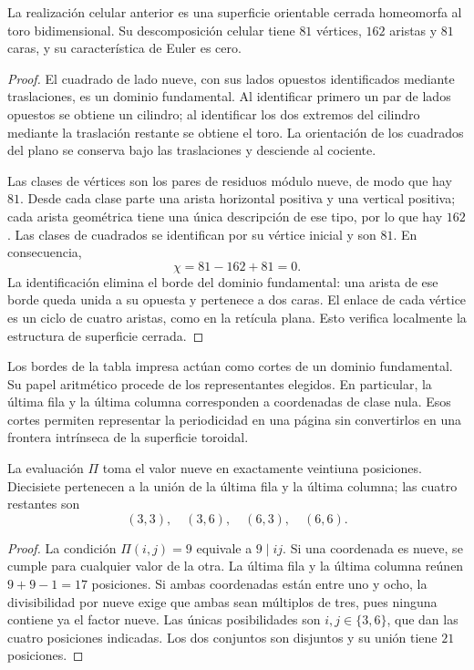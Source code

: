 \begin{proposicion}
\label{geo:prop-toro}
La realización celular anterior es una superficie orientable cerrada homeomorfa al toro bidimensional. Su descomposición celular tiene $81$ vértices, $162$ aristas y $81$ caras, y su característica de Euler es cero.
\end{proposicion}

\begin{proof}
El cuadrado de lado nueve, con sus lados opuestos identificados mediante traslaciones, es un dominio fundamental. Al identificar primero un par de lados opuestos se obtiene un cilindro; al identificar los dos extremos del cilindro mediante la traslación restante se obtiene el toro. La orientación de los cuadrados del plano se conserva bajo las traslaciones y desciende al cociente.

Las clases de vértices son los pares de residuos módulo nueve, de modo que hay $81$. Desde cada clase parte una arista horizontal positiva y una vertical positiva; cada arista geométrica tiene una única descripción de ese tipo, por lo que hay $162$. Las clases de cuadrados se identifican por su vértice inicial y son $81$. En consecuencia,
\[
 \chi=81-162+81=0.
\]
La identificación elimina el borde del dominio fundamental: una arista de ese borde queda unida a su opuesta y pertenece a dos caras. El enlace de cada vértice es un ciclo de cuatro aristas, como en la retícula plana. Esto verifica localmente la estructura de superficie cerrada.
\end{proof}

Los bordes de la tabla impresa actúan como cortes de un dominio fundamental. Su papel aritmético procede de los representantes elegidos. En particular, la última fila y la última columna corresponden a coordenadas de clase nula. Esos cortes permiten representar la periodicidad en una página sin convertirlos en una frontera intrínseca de la superficie toroidal.

\begin{proposicion}
\label{geo:prop-ceros}
La evaluación $\Pi$ toma el valor nueve en exactamente veintiuna posiciones. Diecisiete pertenecen a la unión de la última fila y la última columna; las cuatro restantes son
\[
 (3,3),\quad(3,6),\quad(6,3),\quad(6,6).
\]
\end{proposicion}

\begin{proof}
La condición $\Pi(i,j)=9$ equivale a $9\mid ij$. Si una coordenada es nueve, se cumple para cualquier valor de la otra. La última fila y la última columna reúnen $9+9-1=17$ posiciones. Si ambas coordenadas están entre uno y ocho, la divisibilidad por nueve exige que ambas sean múltiplos de tres, pues ninguna contiene ya el factor nueve. Las únicas posibilidades son $i,j\in\{3,6\}$, que dan las cuatro posiciones indicadas. Los dos conjuntos son disjuntos y su unión tiene $21$ posiciones.
\end{proof}

